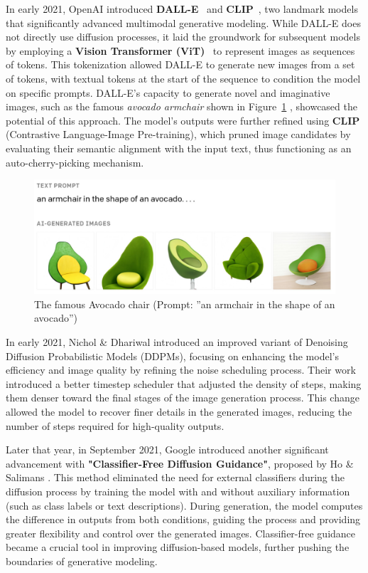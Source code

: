 \documentclass[12pt,DIV14,BCOR12mm,a4paper,footinclude=false,headinclude,parskip=half-,twoside,openright,cleardoublepage=empty,toc=index,bibliography=totoc,listof=totoc]{scrreprt}
\numberwithin{equation}{chapter}
\begin{document}
In early 2021, OpenAI introduced \textbf{DALL-E}~\cite{DALL_E} and \textbf{CLIP}~\cite{CLIP}, two landmark models that significantly advanced multimodal generative modeling. While DALL-E does not directly use diffusion processes, it laid the groundwork for subsequent models by employing a \textbf{Vision Transformer (ViT)}~\cite{ViT} to represent images as sequences of tokens. This tokenization allowed DALL-E to generate new images from a set of tokens, with textual tokens at the start of the sequence to condition the model on specific prompts. DALL-E's capacity to generate novel and imaginative images, such as the famous \emph{avocado armchair} shown in Figure~\ref{AvacadoArmchair} , showcased the potential of this approach. The model's outputs were further refined using \textbf{CLIP} (Contrastive Language-Image Pre-training), which pruned image candidates by evaluating their semantic alignment with the input text, thus functioning as an auto-cherry-picking mechanism.
\begin{figure}
	\centering
	\includegraphics[scale=.3]{../media/DallE-AvacadoArmchair_1208x459.jpg}
	\caption{The famous Avocado chair (Prompt: ”an armchair in the shape of an avocado”)}
	\label{AvacadoArmchair}
\end{figure}

In early 2021, Nichol \& Dhariwal introduced an improved variant of Denoising Diffusion Probabilistic Models (DDPMs), focusing on enhancing the model's efficiency and image quality by refining the noise scheduling process\cite{Improved_denoising_diffusion}. Their work introduced a better timestep scheduler that adjusted the density of steps, making them denser toward the final stages of the image generation process. This change allowed the model to recover finer details in the generated images, reducing the number of steps required for high-quality outputs.

Later that year, in September 2021, Google introduced another significant advancement with \textbf{"Classifier-Free Diffusion Guidance"}, proposed by Ho \& Salimans \cite{ho2022classifier}. This method eliminated the need for external classifiers during the diffusion process by training the model with and without auxiliary information (such as class labels or text descriptions). During generation, the model computes the difference in outputs from both conditions, guiding the process and providing greater flexibility and control over the generated images. Classifier-free guidance became a crucial tool in improving diffusion-based models, further pushing the boundaries of generative modeling.
\end{document}
